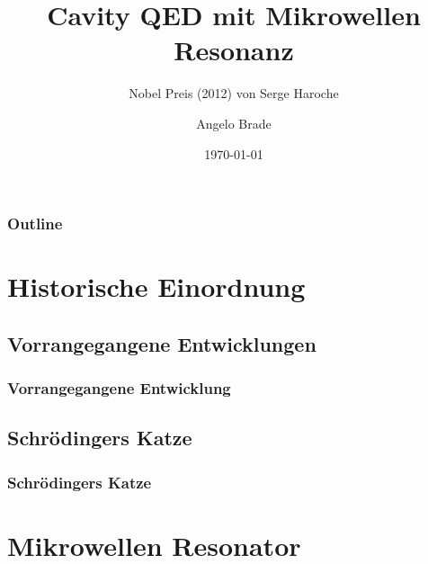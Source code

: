 \documentclass{beamer}
\title{Cavity QED mit Mikrowellen Resonanz}
\subtitle{Nobel Preis (2012) von Serge Haroche}
\author{Angelo Brade}
\institute{University of Bonn}
\date{\today}
\begin{document}
\begin{frame}
	\titlepage
\end{frame}
\begin{frame}
	\frametitle{Outline}
	\tableofcontents
\end{frame}

\section{Historische Einordnung}
\subsection{Vorrangegangene Entwicklungen}
\begin{frame}
	\frametitle{Vorrangegangene Entwicklung}
\end{frame}
\subsection{Schrödingers Katze}
\begin{frame}
	\frametitle{Schrödingers Katze}
\end{frame}
\section{Mikrowellen Resonator}
\end{document}
